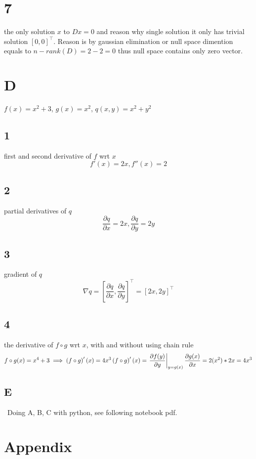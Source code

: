 \documentclass{article}
\begin{document}
\section*{7}
\begin{myleftlinebox}
    the only solution \(x\) to \(Dx=0\) and reason why single solution
    \tcblower
    it only has trivial solution \([0,0]^\top\). Reason is by gaussian elimination or null space dimention equals to \(n-rank(D)=2-2=0\) thus null space contains only zero vector.
\end{myleftlinebox}

\section*{D}
\(f(x) = x^2+3\), \(g(x)=x^2\), \(q(x,y) = x^2+y^2\)
\subsection*{1}

\begin{myleftlinebox}
    first and second derivative of \(f\) wrt \(x\)
    \tcblower
    \[
        f'(x) = 2x, f''(x) = 2  
    \]
\end{myleftlinebox}

\subsection*{2}
\begin{myleftlinebox}
    partial derivatives of \(q\)
    \tcblower
    \[
        \frac{\partial q}{\partial x} =2x, \frac{\partial q}{\partial y} =2y
    \]
\end{myleftlinebox}

\subsection*{3}
\begin{myleftlinebox}
    gradient of \(q\)
    \tcblower
    \[
        \nabla q = [\frac{\partial q}{\partial x},\frac{\partial q}{\partial y}]^\top=[2x,2y]^\top
    \]
\end{myleftlinebox}

\subsection*{4}
\begin{myleftlinebox}
    the derivative of \(f\circ g\) wrt \(x\), with and without using chain rule
    \tcblower
    \[
        f\circ g(x) = x^4+3\implies \left( f\circ g \right)'(x) = 4x^3\\
        \left( f\circ g \right)'(x) = \left.\frac{\partial f(y)}{\partial y}\right|_{y=g(x)} \frac{\partial g(x)}{\partial x} = 2(x^2)*2x=4x^3
    \]
\end{myleftlinebox}

\subsection*{E}\
Doing A, B, C with python, see following notebook pdf.





\newpage

%
%

\newpage
\appendix
\section{Appendix}
\end{document}

